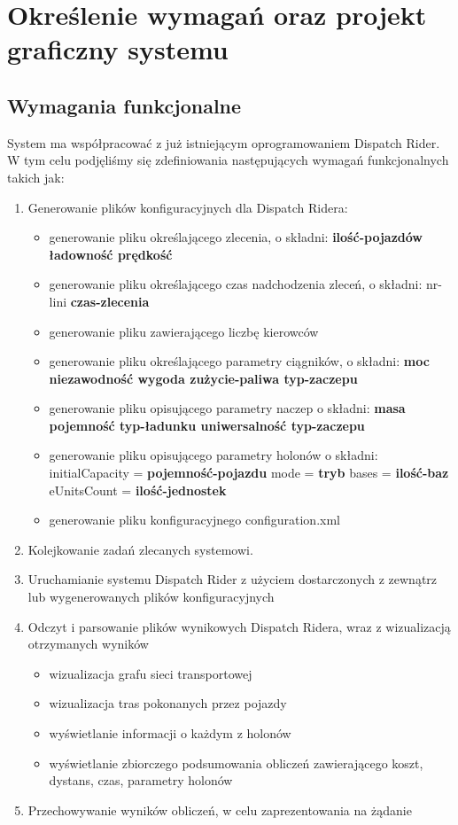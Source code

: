 \chapter{Określenie wymagań oraz projekt graficzny systemu}

\section{Wymagania funkcjonalne}
System ma współpracować z już istniejącym oprogramowaniem Dispatch Rider. W tym celu podjęliśmy się zdefiniowania następujących wymagań funkcjonalnych takich jak:

\begin{enumerate}
	\item Generowanie plików konfiguracyjnych dla Dispatch Ridera:
		\begin{itemize}
			\item generowanie pliku określającego zlecenia, o składni:
			\textbf{ilość-pojazdów ładowność prędkość}
			\item generowanie pliku określającego czas nadchodzenia zleceń, o składni: nr-lini \textbf{czas-zlecenia}
			\item generowanie pliku zawierającego liczbę kierowców
			\item generowanie pliku określającego parametry ciągników, o składni: \textbf{moc niezawodność wygoda zużycie-paliwa typ-zaczepu}
			\item generowanie pliku opisującego parametry naczep o składni: \textbf{masa pojemność typ-ładunku uniwersalność typ-zaczepu}
			\item generowanie pliku opisującego parametry holonów o składni: initialCapacity = \textbf{pojemność-pojazdu} mode = \textbf{tryb} bases = \textbf{ilość-baz} eUnitsCount = \textbf{ilość-jednostek}
			\item generowanie pliku konfiguracyjnego configuration.xml
		\end{itemize}
		
	\item Kolejkowanie zadań zlecanych systemowi.
	
	\item Uruchamianie systemu Dispatch Rider z użyciem dostarczonych z zewnątrz lub wygenerowanych plików konfiguracyjnych
	
	\item Odczyt i parsowanie plików wynikowych Dispatch Ridera, wraz z wizualizacją otrzymanych wyników
		\begin{itemize}
			\item wizualizacja grafu sieci transportowej
			\item wizualizacja tras pokonanych przez pojazdy
			\item wyświetlanie informacji o każdym z holonów 
			\item wyświetlanie zbiorczego podsumowania obliczeń zawierającego koszt, dystans, czas, parametry holonów
		\end{itemize}
	\item Przechowywanie wyników obliczeń, w celu zaprezentowania na żądanie
\end{enumerate}

